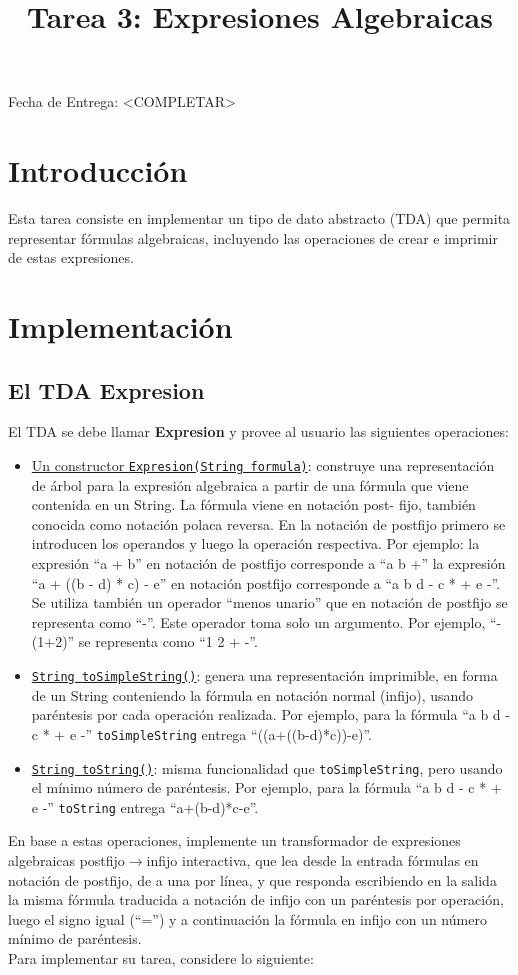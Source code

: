 \documentclass[dcc]{fcfmcourse}
\title{Tarea 3: Expresiones Algebraicas}
\begin{document}
\maketitle
\vspace{-2ex}
\begin{center}
Fecha de Entrega: <COMPLETAR>
\end{center}


\section{Introducción}
Esta tarea consiste en implementar un tipo de dato abstracto (TDA)
que permita representar fórmulas algebraicas, incluyendo las operaciones de
crear e imprimir  de estas expresiones. 


\section{Implementación}
\subsection{El TDA Expresion}
El TDA se debe llamar \textbf{Expresion} y provee al usuario las siguientes
operaciones:
\begin{itemize}
\item \underline{Un constructor \texttt{Expresion(String formula)}}: construye una representación
de árbol para la expresión algebraica a partir de una fórmula
que viene contenida en un String. La fórmula viene en notación post-
fijo, también conocida como notación polaca reversa. En la notación
de postfijo primero se introducen los operandos y luego la operación
respectiva. Por ejemplo: la expresión “a + b” en notación de postfijo
corresponde a “a b +” la expresión “a + ((b - d) * c) - e” en notación
postfijo corresponde a “a b d - c * + e -”. Se utiliza también un operador
“menos unario” que en notación de postfijo se representa como
“-”. Este operador toma solo un argumento. Por ejemplo, “-(1+2)” se
representa como “1 2 + -”.
\item \underline{\texttt{String toSimpleString()}}: genera una representación imprimible, en forma
de un String conteniendo la fórmula en notación normal (infijo), usando
paréntesis por cada operación realizada. Por ejemplo, para la fórmula “a b d - c * + e -” \texttt{toSimpleString}  entrega “((a+((b-d)*c))-e)”.
\item \underline{\texttt{String toString()}}: misma funcionalidad que \texttt{toSimpleString}, pero usando
el mínimo número de paréntesis. Por ejemplo, para la fórmula “a b d - c * + e -” \texttt{toString}  entrega “a+(b-d)*c-e”.

\end{itemize}
En base a estas operaciones, implemente un transformador de expresiones algebraicas postfijo$\rightarrow$infijo interactiva, que lea desde la entrada fórmulas en notación de postfijo, de a una por línea, y que responda escribiendo en la salida la misma fórmula traducida a notación de infijo con un paréntesis por operación, luego el signo igual (“=”) y a continuación  la fórmula en infijo con un número mínimo de paréntesis.\\
Para implementar su tarea, considere lo siguiente:
\end{document}
